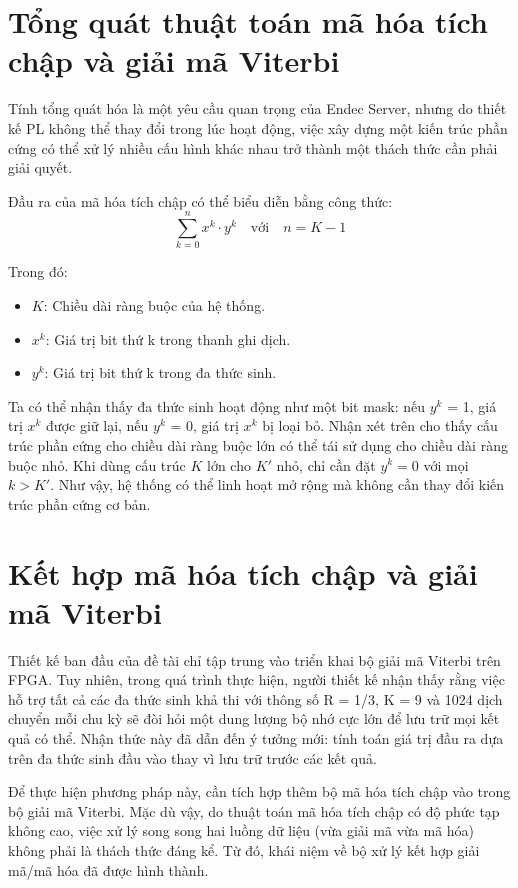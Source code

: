 \documentclass[../DoAn.tex]{subfiles}
\begin{document}
\section{Tổng quát thuật toán mã hóa tích chập và giải mã Viterbi}

Tính tổng quát hóa là một yêu cầu quan trọng của Endec Server, nhưng do thiết kế PL không thể thay đổi trong lúc hoạt động, việc xây dựng một kiến trúc phần cứng có thể xử lý nhiều cấu hình khác nhau trở thành một thách thức cần phải giải quyết.  
 
Đầu ra của mã hóa tích chập có thể biểu diễn bằng công thức:  
\[
\sum_{k=0}^n x^k \cdot y^k \quad \text{với} \quad n = K - 1
\]  

Trong đó:
\begin{itemize}
    \item $K$: Chiều dài ràng buộc của hệ thống.
    \item $x^k$: Giá trị bit thứ k trong thanh ghi dịch.
    \item $y^k$: Giá trị bit thứ k trong đa thức sinh.
\end{itemize}  

Ta có thể nhận thấy đa thức sinh hoạt động như một bit mask: nếu $y^k$ = 1, giá trị $x^k$ được giữ lại, nếu $y^k$ = 0, giá trị $x^k$ bị loại bỏ. Nhận xét trên cho thấy cấu trúc phần cứng cho chiều dài ràng buộc lớn có thể tái sử dụng cho chiều dài ràng buộc nhỏ. Khi dùng cấu trúc $K$ lớn cho $K'$ nhỏ, chỉ cần đặt $y^k = 0$ với mọi $k > K'$. Như vậy, hệ thống có thể linh hoạt mở rộng mà không cần thay đổi kiến trúc phần cứng cơ bản. 

\section{Kết hợp mã hóa tích chập và giải mã Viterbi}
\label{section:Kết hợp mã hóa tích chập và giải mã Viterbi}

Thiết kế ban đầu của đề tài chỉ tập trung vào triển khai bộ giải mã Viterbi trên FPGA. Tuy nhiên, trong quá trình thực hiện, người thiết kế nhận thấy rằng việc hỗ trợ tất cả các đa thức sinh khả thi với thông số R = 1/3, K = 9 và 1024 dịch chuyển mỗi chu kỳ sẽ đòi hỏi một dung lượng bộ nhớ cực lớn để lưu trữ mọi kết quả có thể. Nhận thức này đã dẫn đến ý tưởng mới: tính toán giá trị đầu ra dựa trên đa thức sinh đầu vào thay vì lưu trữ trước các kết quả.

Để thực hiện phương pháp này, cần tích hợp thêm bộ mã hóa tích chập vào trong bộ giải mã Viterbi. Mặc dù vậy, do thuật toán mã hóa tích chập có độ phức tạp không cao, việc xử lý song song hai luồng dữ liệu (vừa giải mã vừa mã hóa) không phải là thách thức đáng kể. Từ đó, khái niệm về bộ xử lý kết hợp giải mã/mã hóa đã được hình thành.
\end{document}
